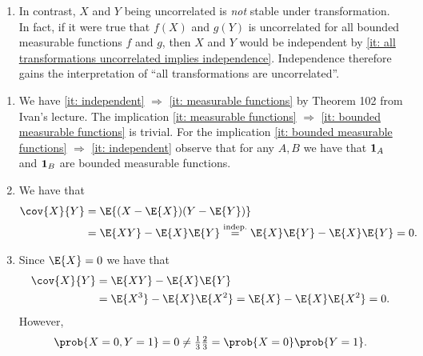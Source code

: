 \begin{exercise}[subtitle={Uncorrelated vs independent \Coffeecup\Coffeecup}]
\begin{remark}[Interpretation]
\begin{enumerate}
            \item In contrast, \(X\) and \(Y\) being uncorrelated is \emph{not} stable under transformation.
            In fact, if it were true that \(f(X)\) and \(g(Y)\) is uncorrelated
            for all bounded measurable functions \(f\) and \(g\), then \(X\) and
            \(Y\) would be independent by \ref{it: all transformations
            uncorrelated implies independence}. Independence therefore gains the
            interpretation of ``all transformations are uncorrelated''.
        \end{enumerate}
    \end{remark}
\end{exercise}

\begin{solution}
\begin{enumerate}[wide=0pt]
    \item[\ref{it: independent} \(\Leftrightarrow\) \ref{it: measurable functions} \(\Leftrightarrow\) \ref{it: bounded measurable functions}:]

    We have \ref{it: independent} \(\Rightarrow\) \ref{it: measurable functions} by Theorem 102 from Ivan's lecture.
    The implication \ref{it: measurable functions} \(\Rightarrow\) \ref{it: bounded measurable functions} is trivial.
    For the implication \ref{it: bounded measurable functions} \(\Rightarrow\) \ref{it: independent} observe that for any \(A, B\) we have
    that \(\ind{A}\) and \(\ind{B}\) are bounded measurable functions.

    \item[\ref{it: idep => uncor}]
    We have that
    \begin{align*}
        \cov{X}{Y}
        &= \E{(X-\E{X})(Y-\E{Y})}
        \\
        &= \E{XY} - \E{X}\E{Y}
        \overset{\text{indep.}}=
        \E{X}\E{Y} - \E{X}\E{Y} = 0.
    \end{align*}

    \item[\ref{it: uncor not indep}]
    Since \(\E{X} = 0\) we have that
    \begin{align*}
        \cov{X}{Y}
        &= \E{XY} - \E{X}\E{Y}
        \\
        &= \E{X^3} - \E{X}\E{X^2}
        = \E{X} - \E{X}\E{X^2}
        = 0.
    \end{align*}
    However, 
    \[
        \prob{X=0, Y=1} =0 \neq \tfrac13 \tfrac23 = \prob{X=0}\prob{Y=1}.
    \]


\end{enumerate}
\end{solution}
